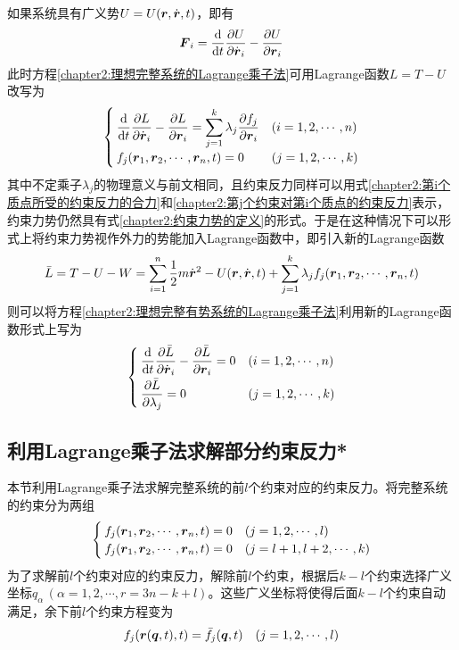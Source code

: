 如果系统具有广义势$U=U(\boldsymbol{r},\dot{\boldsymbol{r}},t)$，即有
\begin{equation}
	\boldsymbol{F}_i = \frac{\mathrm{d}}{\mathrm{d} t} \frac{\partial U}{\partial \dot{\boldsymbol{r}}_i} - \frac{\partial U}{\partial \boldsymbol{r}_i}
\end{equation}
此时方程\eqref{chapter2:理想完整系统的Lagrange乘子法}可用Lagrange函数$L=T-U$改写为
\begin{equation}
\begin{cases}
	\displaystyle \frac{\mathrm{d}}{\mathrm{d} t} \frac{\partial L}{\partial \dot{\boldsymbol{r}}_i} - \frac{\partial L}{\partial \boldsymbol{r}_i} = \sum_{j=1}^k \lambda_j \frac{\partial f_j}{\partial \boldsymbol{r}_i} & (i = 1,2,\cdots,n) \\
	\displaystyle f_j(\boldsymbol{r}_1,\boldsymbol{r}_2,\cdots,\boldsymbol{r}_n,t) = 0 & (j=1,2,\cdots,k)
\end{cases}
\label{chapter2:理想完整有势系统的Lagrange乘子法}
\end{equation}
其中不定乘子$\lambda_j$的物理意义与前文相同，且约束反力同样可以用式\eqref{chapter2:第i个质点所受的约束反力的合力}和\eqref{chapter2:第j个约束对第i个质点的约束反力}表示，约束力势仍然具有式\eqref{chapter2:约束力势的定义}的形式。于是在这种情况下可以形式上将约束力势视作外力的势能加入Lagrange函数中，即引入新的Lagrange函数
\begin{equation}
	\bar{L} = T-U-W = \sum_{i=1}^n \frac12 m\dot{\boldsymbol{r}}^2 - U(\boldsymbol{r},\dot{\boldsymbol{r}},t) + \sum_{j=1}^k \lambda_j f_j(\boldsymbol{r}_1,\boldsymbol{r}_2,\cdots,\boldsymbol{r}_n,t)
\end{equation}
则可以将方程\eqref{chapter2:理想完整有势系统的Lagrange乘子法}利用新的Lagrange函数形式上写为
\begin{equation}
\begin{cases}
	\displaystyle \frac{\mathrm{d}}{\mathrm{d} t} \frac{\partial \bar{L}}{\partial \dot{\boldsymbol{r}}_i} - \frac{\partial \bar{L}}{\partial \boldsymbol{r}_i} = 0 & (i=1,2,\cdots,n) \\[1.5ex]
	\displaystyle \frac{\partial \bar{L}}{\partial \lambda_j} = 0 & (j = 1,2,\cdots,k)
\end{cases}
\end{equation}

\subsection{利用Lagrange乘子法求解部分约束反力*}

本节利用Lagrange乘子法求解完整系统的前$l$个约束对应的约束反力。将完整系统的约束分为两组
\begin{equation*}
\begin{cases}
	f_j(\boldsymbol{r}_1,\boldsymbol{r}_2,\cdots,\boldsymbol{r}_n,t) = 0 & (j = 1,2,\cdots,l) \\
	f_j(\boldsymbol{r}_1,\boldsymbol{r}_2,\cdots,\boldsymbol{r}_n,t) = 0 & (j = l+1,l+2,\cdots,k)
\end{cases}
\end{equation*}
为了求解前$l$个约束对应的约束反力，解除前$l$个约束，根据后$k-l$个约束选择广义坐标$q_\alpha\,(\alpha=1,2,\cdots,r = 3n-k+l)$。这些广义坐标将使得后面$k-l$个约束自动满足，余下前$l$个约束方程变为
\begin{equation}
	f_j(\boldsymbol{r}(\boldsymbol{q},t),t) = \bar{f}_j(\boldsymbol{q},t) \quad (j=1,2,\cdots,l)
	\label{chapter2:解除部分约束后余下的约束方程}
\end{equation}

